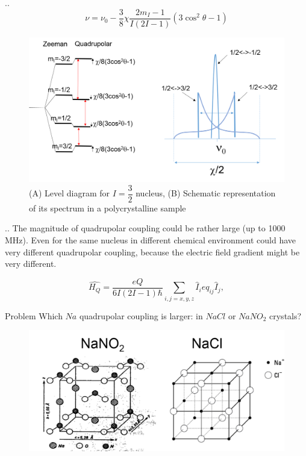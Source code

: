 \documentclass{beamer}
\begin{document}
\begin{frame}{\thesection.\thesubsection. \insertsubsection}
    	\begin{equation}
    	\nu = \nu_0 -\dfrac{3}{8} \chi \dfrac{2 m_I -1}{I(2I -1)}(3 \cos^2 \theta - 1)
    	\end{equation}
    	
    	\begin{figure}
    		\centering
    		\includegraphics[scale=0.4]{figures/Quadrupole2.png}
    		\caption{(A) Level diagram for $I=\dfrac{3}{2}$ nucleus, (B) Schematic representation of its spectrum in a polycrystalline sample}
    	\end{figure}
\end{frame}

\begin{frame}[shrink=5]{\thesection.\thesubsection. \insertsubsection}
  The magnitude of quadrupolar coupling could be rather large (up to 1000 MHz). Even for the same nucleus in different chemical environment could have very different quadrupolar coupling, because the electric field gradient might be very different.
  
  \begin{equation}
  \hat{H_Q} = \dfrac{eQ}{6I(2I-1)\hbar} \sum_{i,j=x,y,z} \hat{I}_i e q_{ij}  \hat{I}_j, 
  \end{equation}
  
  \begin{block}{Problem}
  	Which $Na$ quadrupolar coupling is larger: in $NaCl$ or $NaNO_2$ crystals?
  \end{block}

	\begin{figure}
	\centering
	\includegraphics[scale=0.5]{figures/Quadrupole3.png}
    \end{figure}

\end{frame}
\end{document}
